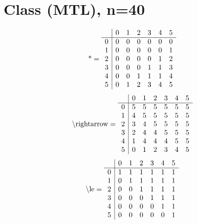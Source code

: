 \documentclass[11pt]{article}
\begin{document}
\section{Class (MTL), n=40}
\[\text{*} = 
\begin{array}{r | r r r r r r}
 & 0 & 1 & 2 & 3 & 4 & 5 \\ \hline
0 & 0 & 0 & 0 & 0 & 0 & 0 \\
1 & 0 & 0 & 0 & 0 & 0 & 1 \\
2 & 0 & 0 & 0 & 0 & 1 & 2 \\
3 & 0 & 0 & 0 & 1 & 1 & 3 \\
4 & 0 & 0 & 1 & 1 & 1 & 4 \\
5 & 0 & 1 & 2 & 3 & 4 & 5 \\
\end{array}
\]
\[\text{\textbackslash rightarrow} = 
\begin{array}{r | r r r r r r}
 & 0 & 1 & 2 & 3 & 4 & 5 \\ \hline
0 & 5 & 5 & 5 & 5 & 5 & 5 \\
1 & 4 & 5 & 5 & 5 & 5 & 5 \\
2 & 3 & 4 & 5 & 5 & 5 & 5 \\
3 & 2 & 4 & 4 & 5 & 5 & 5 \\
4 & 1 & 4 & 4 & 4 & 5 & 5 \\
5 & 0 & 1 & 2 & 3 & 4 & 5 \\
\end{array}
\]
\[\text{\textbackslash le} = 
\begin{array}{r | r r r r r r}
 & 0 & 1 & 2 & 3 & 4 & 5 \\ \hline
0 & 1 & 1 & 1 & 1 & 1 & 1 \\
1 & 0 & 1 & 1 & 1 & 1 & 1 \\
2 & 0 & 0 & 1 & 1 & 1 & 1 \\
3 & 0 & 0 & 0 & 1 & 1 & 1 \\
4 & 0 & 0 & 0 & 0 & 1 & 1 \\
5 & 0 & 0 & 0 & 0 & 0 & 1 \\
\end{array}
\]
\end{document}
